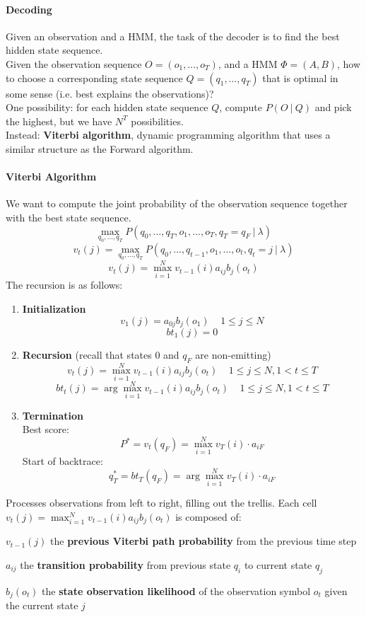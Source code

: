 \documentclass[10pt]{report}
\begin{document}
\paragraph{Decoding} Given an observation and a HMM, the task of the decoder is to find the best hidden state sequence.\\
Given the observation sequence $O = (o_1,\ldots,o_T)$, and a HMM $\Phi = (A, B)$, how to choose a corresponding state sequence $Q = (q_1,\ldots,q_T)$ that is optimal in some sense (i.e. best explains the observations)?\\
One possibility: for each hidden state sequence $Q$, compute $P(O\:|\:Q)$ and pick the highest, but we have $N^T$ possibilities.\\
Instead: \textbf{Viterbi algorithm}, dynamic programming algorithm that uses a similar structure as the Forward algorithm.
\paragraph{Viterbi Algorithm} We want to compute the joint probability of the observation sequence together with the best state sequence.
$$\max_{q_0,\ldots,q_T} P(q_0,\ldots,q_T,o_1,\ldots,o_T, q_T=q_F\:|\:\lambda)$$
$$v_t(j) = \max_{q_0,\ldots,q_T} P(q_0,\ldots,q_{t-1},o_1,\ldots,o_t, q_t=j\:|\:\lambda)$$
$$v_t(j) = \max_{i=1}^N v_{t-1}(i)a_{ij}b_j(o_t)$$
The recursion is as follows:
\begin{enumerate}
	\item \textbf{Initialization}
	$$v_1(j) = a_{0j}b_j(o_1)\:\:\:\:\:1\leq j\leq N$$
	$$bt_1(j) = 0$$
	\item \textbf{Recursion} (recall that states 0 and $q_F$ are non-emitting)
	$$v_t(j) = \max_{i=1}^N v_{t-1}(i)a_{ij}b_j(o_t)\:\:\:\:\:1\leq j\leq N, 1<t\leq T$$
	$$bt_t(j) = \arg\max_{i=1}^Nv_{t-1}(i)a_{ij}b_j(o_t)\:\:\:\:\:1\leq j\leq N, 1<t\leq T$$
	\item \textbf{Termination}\\
	Best score: $$P^* = v_t(q_F) = \max_{i=1}^N v_T(i)\cdot a_{iF}$$
	Start of backtrace: $$q_T^* = bt_T(q_F) = \arg\max_{i=1}^N v_T(i)\cdot a_{iF}$$
\end{enumerate}
Processes observations from left to right, filling out the trellis. Each cell $v_t(j) = \max_{i=1}^N v_{t-1}(i)a_{ij}b_j(o_t)$ is composed of:
\begin{list}{}{}
	\item $v_{t-1}(j)$ the \textbf{previous Viterbi path probability} from the previous time step
	\item $a_{ij}$ the \textbf{transition probability} from previous state $q_i$ to current state $q_j$
	\item $b_j(o_t)$ the \textbf{state observation likelihood} of the observation symbol $o_t$ given the current state $j$
\end{list}
\end{document}
